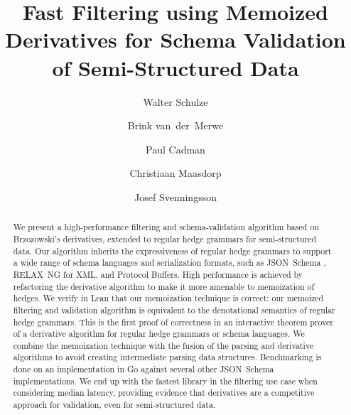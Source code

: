 \documentclass[runningheads]{llncs}
\newif\ifanonymous
\newcommand{\RelaxNG}{%
  RELAX~NG\xspace%
}
\newcommand{\JSONSchema}{%
  JSON~Schema\xspace%
}
\begin{document}
\title{Fast Filtering using Memoized Derivatives for Schema Validation of Semi-Structured Data}

\ifanonymous
  \author{Anonymous Author(s)}
  \authorrunning{Anonymous Author(s)}
  \institute{Anonymous Institution(s)}
\else
  \author{
    Walter Schulze \and
    Brink van~der~Merwe \and
    Paul Cadman \and
    Christiaan Maasdorp \and
    Josef Svenningsson \and
  }
\fi

\maketitle

\begin{abstract}
We present a high-performance filtering and schema-validation algorithm based on Brzozowski’s derivatives, extended to regular hedge grammars for semi-structured data.
Our algorithm inherits the expressiveness of regular hedge grammars to support a wide range of schema languages and serialization formats, such as \JSONSchema, \RelaxNG for XML, and Protocol Buffers.
High performance is achieved by refactoring the derivative algorithm to make it more amenable to memoization of hedges.
We verify in Lean that our memoization technique is correct: our memoized filtering and validation algorithm is equivalent to the denotational semantics of regular hedge grammars.
This is the first proof of correctness in an interactive theorem prover of a derivative algorithm for regular hedge grammars or schema languages.
We combine the memoization technique with the fusion of the parsing and derivative algorithms to avoid creating intermediate parsing data structures.
Benchmarking is done on an implementation in Go against several other \JSONSchema implementations.
We end up with the fastest library in the filtering use case when considering median latency, providing evidence that derivatives are a competitive approach for validation, even for semi-structured data.

\end{abstract}
\end{document}
